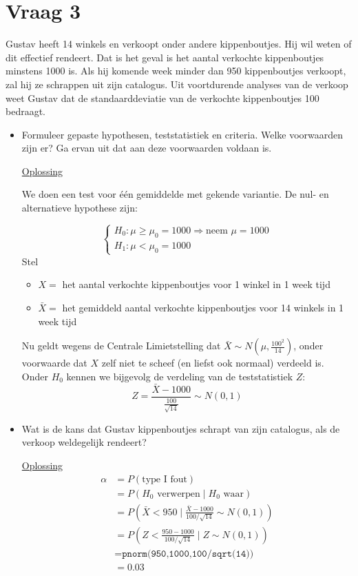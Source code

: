 \documentclass[kulak]{kulakarticle} %
\begin{document}
\newpage

\section*{Vraag 3}
Gustav heeft 14 winkels en verkoopt onder andere kippenboutjes. Hij wil weten of dit effectief rendeert. Dat is het geval is het aantal verkochte kippenboutjes minstens 1000 is. Als hij komende week minder dan 950 kippenboutjes verkoopt, zal hij ze schrappen uit zijn catalogus. Uit voortdurende analyses van de verkoop weet Gustav dat de standaarddeviatie van de verkochte kippenboutjes 100 bedraagt.

\begin{itemize}
	\item Formuleer gepaste hypothesen, teststatistiek en criteria. Welke voorwaarden zijn er? Ga ervan uit dat aan deze voorwaarden voldaan is.

	\underline{Oplossing}

	We doen een test voor één gemiddelde met gekende variantie. De nul- en alternatieve hypothese zijn:

	\[\begin{cases}
		H_0: \mu \geq \mu_0 = 1000 \Rightarrow \text{neem } \mu = 1000 \\
		H_1: \mu < \mu_0 = 1000
	\end{cases}\]
	Stel
	\begin{itemize}
		\item \(X=\) het aantal verkochte kippenboutjes voor 1 winkel in 1 week tijd
		\item \(\bar{X}=\) het gemiddeld aantal verkochte kippenboutjes voor 14 winkels in 1 week tijd
	\end{itemize}

	Nu geldt wegens de Centrale Limietstelling dat \(\bar{X}\sim N\left(\mu,\frac{100^2}{14}\right)\), onder voorwaarde dat \(X\) zelf niet te scheef (en liefst ook normaal) verdeeld is.
	\\

	Onder \(H_0\) kennen we bijgevolg de verdeling van de teststatistiek \(Z\): \[Z = \frac{\bar{X}-1000}{\frac{100}{\sqrt{14}}}\sim N(0,1)\]

	\item Wat is de kans dat Gustav kippenboutjes schrapt van zijn catalogus, als de verkoop weldegelijk rendeert?

	\underline{Oplossing}
	\begin{align*}
		\alpha & = P(\text{type I fout})                                                        \\
		& = P(H_0 \text{ verwerpen} \mid H_0 \text{ waar})                              \\
		& = P\left(\bar{X}<950 \mid \frac{\bar{X}-1000}{100/\sqrt{14}}\sim N(0,1)\right) \\
		& = P\left(Z<\frac{950-1000}{100/\sqrt{14}} \mid Z \sim N(0,1) \right)                  \\
		& = \texttt{pnorm(950,1000,100/sqrt(14))}\\
		& = 0.03
	\end{align*}


\end{itemize}
\end{document}
